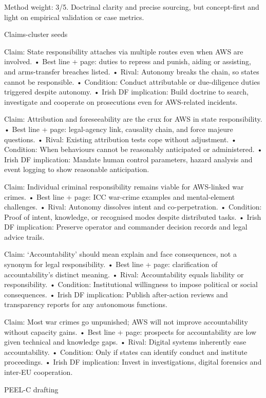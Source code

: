 Method weight: 3/5. Doctrinal clarity and precise sourcing, but concept-first and light on empirical validation or case metrics.

Claims-cluster seeds

Claim: State responsibility attaches via multiple routes even when AWS are involved.
• Best line + page: duties to repress and punish, aiding or assisting, and arms-transfer breaches listed.
• Rival: Autonomy breaks the chain, so states cannot be responsible.
• Condition: Conduct attributable or due-diligence duties triggered despite autonomy.
• Irish DF implication: Build doctrine to search, investigate and cooperate on prosecutions even for AWS-related incidents.

Claim: Attribution and foreseeability are the crux for AWS in state responsibility.
• Best line + page: legal-agency link, causality chain, and force majeure questions.
• Rival: Existing attribution tests cope without adjustment.
• Condition: When behaviours cannot be reasonably anticipated or administered.
• Irish DF implication: Mandate human control parameters, hazard analysis and event logging to show reasonable anticipation.

Claim: Individual criminal responsibility remains viable for AWS-linked war crimes.
• Best line + page: ICC war-crime examples and mental-element challenges.
• Rival: Autonomy dissolves intent and co-perpetration.
• Condition: Proof of intent, knowledge, or recognised modes despite distributed tasks.
• Irish DF implication: Preserve operator and commander decision records and legal advice trails.

Claim: ‘Accountability’ should mean explain and face consequences, not a synonym for legal responsibility.
• Best line + page: clarification of accountability’s distinct meaning.
• Rival: Accountability equals liability or responsibility.
• Condition: Institutional willingness to impose political or social consequences.
• Irish DF implication: Publish after-action reviews and transparency reports for any autonomous functions.

Claim: Most war crimes go unpunished; AWS will not improve accountability without capacity gains.
• Best line + page: prospects for accountability are low given technical and knowledge gaps.
• Rival: Digital systems inherently ease accountability.
• Condition: Only if states can identify conduct and institute proceedings.
• Irish DF implication: Invest in investigations, digital forensics and inter-EU cooperation.

PEEL-C drafting

